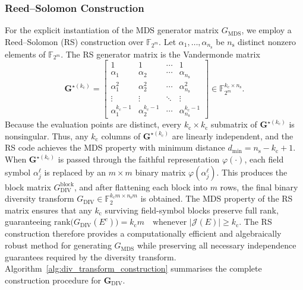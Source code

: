 \documentclass[journal]{IEEEtran}
\begin{document}
\subsubsection*{Reed--Solomon Construction}
For the explicit instantiation of the MDS generator matrix 
$G_{\mathrm{MDS}}$, we employ a Reed--Solomon (RS) construction over 
$\mathbb{F}_{2^{m}}$. Let $\alpha_{1},\ldots,\alpha_{n_{\mathrm{s}}}$ 
be $n_{\mathrm{s}}$ distinct nonzero elements of $\mathbb{F}_{2^{m}}$. 
The RS generator matrix is the Vandermonde matrix
\begin{equation}
\mathbf{G}^{\star(k_{\mathrm{c}})} =
\begin{bmatrix}
1 & 1 & \cdots & 1 \\
\alpha_1 & \alpha_2 & \cdots & \alpha_{n_{\mathrm{s}}} \\
\alpha_1^2 & \alpha_2^2 & \cdots & \alpha_{n_{\mathrm{s}}}^2 \\
\vdots & \vdots & \ddots & \vdots \\
\alpha_1^{k_{\mathrm{c}}-1} & \alpha_2^{k_{\mathrm{c}}-1} & 
\cdots & \alpha_{n_{\mathrm{s}}}^{k_{\mathrm{c}}-1}
\end{bmatrix}
\in \mathbb{F}_{2^{m}}^{k_{\mathrm{c}} \times n_{\mathrm{s}}}.
\label{eq:RS_generator_final}
\end{equation}
Because the evaluation points are distinct, every 
$k_{\mathrm{c}} \times k_{\mathrm{c}}$ submatrix of 
$\mathbf{G}^{\star(k_{\mathrm{c}})}$ is nonsingular. Thus, any 
$k_{\mathrm{c}}$ columns of $\mathbf{G}^{\star(k_{\mathrm{c}})}$ 
are linearly independent, and the RS code achieves the MDS property 
with minimum distance $d_{\min} = n_{\mathrm{s}}-k_{\mathrm{c}}+1$. When $\mathbf{G}^{\star(k_{\mathrm{c}})}$ is passed through the 
faithful representation $\varphi(\cdot)$, each field symbol 
$\alpha_j^{\ell}$ is replaced by an $m \times m$ binary matrix 
$\varphi(\alpha_j^{\ell})$. This produces the block matrix 
$G_{\mathrm{DIV}}^{\mathrm{block}}$, and after flattening each 
block into $m$ rows, the final binary diversity transform
$G_{\mathrm{DIV}} \in \mathbb{F}_{2}^{k_{\mathrm{c}} m \times 
n_{\mathrm{s}} m}$
is obtained. The MDS property of the RS matrix ensures that any 
$k_{\mathrm{c}}$ surviving field-symbol blocks preserve full rank, 
guaranteeing $\mathrm{rank}\bigl(G_{\mathrm{DIV}}(E^{c})\bigr) = k_{\mathrm{c}} m \quad\text{whenever } |\mathcal{J}(E)| \ge k_{\mathrm{c}}.
$
The RS construction therefore provides a computationally efficient and  algebraically 
robust method for generating 
$G_{\mathrm{MDS}}$ while preserving all necessary independence 
guarantees required by the diversity transform. Algorithm~\ref{alg:div_transform_construction} summarises the complete construction procedure for $\mathbf{G}_{\mathrm{DIV}}$.
\end{document}
